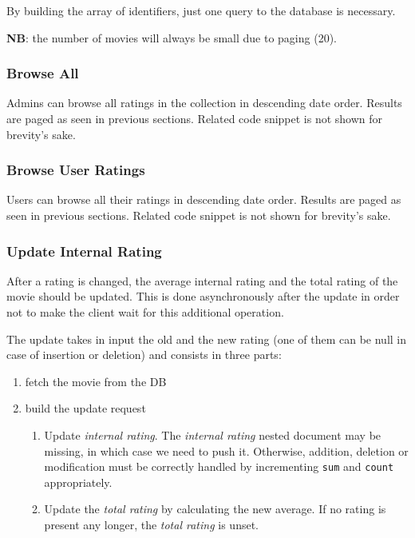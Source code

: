\documentclass[11pt]{article}
\begin{document}
By building the array of identifiers, just one query to the database is necessary.

\textbf{NB}: the number of movies will always be small due to paging (20).



\subsubsection{Browse All}
Admins can browse all ratings in the collection in descending date order. Results are paged as seen in previous sections. Related code snippet is not shown for brevity's sake.

\subsubsection{Browse User Ratings}
Users can browse all their ratings in descending date order. Results are paged as seen in previous sections. Related code snippet is not shown for brevity's sake.

\subsubsection{Update Internal Rating}
\label{sssec:updateInternalRating}
After a rating is changed, the average internal rating and the total rating of the movie should be updated. This is done asynchronously after the update in order not to make the client wait for this additional operation.

The update takes in input the old and the new rating (one of them can be null in case of insertion or deletion) and consists in three parts:
\begin{enumerate}
	\item fetch the movie from the DB
	\item build the update request
	\begin{enumerate}
		\item Update \emph{internal rating}. The \emph{internal rating} nested document may be missing, in which case we need to push it. Otherwise, addition, deletion or modification must be correctly handled by incrementing \texttt{sum} and \texttt{count} appropriately.
		\item Update the \emph{total rating} by calculating the new average. If no rating is present any longer, the \emph{total rating} is unset.
	\end{enumerate}
\end{enumerate}
\end{document}
